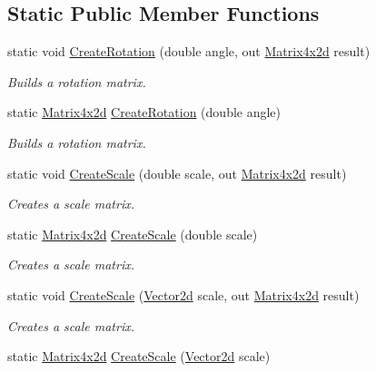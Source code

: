 \subsection*{Static Public Member Functions}
\begin{DoxyCompactItemize}
\item 
static void \hyperlink{struct_open_t_k_1_1_matrix4x2d_a0a574dac05ea876214d81e04362cdb9b}{Create\-Rotation} (double angle, out \hyperlink{struct_open_t_k_1_1_matrix4x2d}{Matrix4x2d} result)
\begin{DoxyCompactList}\small\item\em Builds a rotation matrix. \end{DoxyCompactList}\item 
static \hyperlink{struct_open_t_k_1_1_matrix4x2d}{Matrix4x2d} \hyperlink{struct_open_t_k_1_1_matrix4x2d_af04c797d4e3055ae60552e5f775ce05c}{Create\-Rotation} (double angle)
\begin{DoxyCompactList}\small\item\em Builds a rotation matrix. \end{DoxyCompactList}\item 
static void \hyperlink{struct_open_t_k_1_1_matrix4x2d_ae3fb6313886014b714dbb4df92779ef3}{Create\-Scale} (double scale, out \hyperlink{struct_open_t_k_1_1_matrix4x2d}{Matrix4x2d} result)
\begin{DoxyCompactList}\small\item\em Creates a scale matrix. \end{DoxyCompactList}\item 
static \hyperlink{struct_open_t_k_1_1_matrix4x2d}{Matrix4x2d} \hyperlink{struct_open_t_k_1_1_matrix4x2d_a714a45dfd3108c34c1520de8f353f204}{Create\-Scale} (double scale)
\begin{DoxyCompactList}\small\item\em Creates a scale matrix. \end{DoxyCompactList}\item 
static void \hyperlink{struct_open_t_k_1_1_matrix4x2d_a3ab74f6376e1d9d1eaed7e8539096556}{Create\-Scale} (\hyperlink{struct_open_t_k_1_1_vector2d}{Vector2d} scale, out \hyperlink{struct_open_t_k_1_1_matrix4x2d}{Matrix4x2d} result)
\begin{DoxyCompactList}\small\item\em Creates a scale matrix. \end{DoxyCompactList}\item 
static \hyperlink{struct_open_t_k_1_1_matrix4x2d}{Matrix4x2d} \hyperlink{struct_open_t_k_1_1_matrix4x2d_a9a198f735dd580f15275ab3325b799c9}{Create\-Scale} (\hyperlink{struct_open_t_k_1_1_vector2d}{Vector2d} scale)

\end{DoxyCompactItemize}
